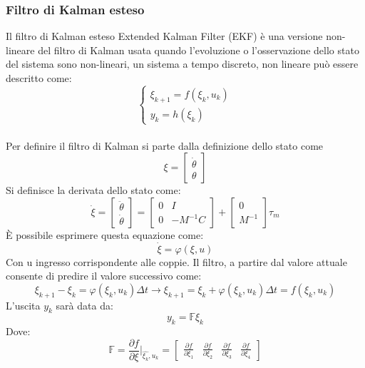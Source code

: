 \subsubsection*{Filtro di Kalman esteso}
Il filtro di Kalman esteso Extended Kalman Filter (EKF) è una versione non-lineare del filtro di Kalman usata quando l'evoluzione o l'osservazione dello stato del sistema sono non-lineari, un sistema a tempo discreto, non lineare può essere descritto come:
\begin{equation}
	\begin{cases}
		\xi_{k+1} = f(\xi_k,u_k)\\
		y_k = h(\xi_k)
	\end{cases}
\end{equation}
\\Per definire il filtro di Kalman si parte dalla definizione dello stato come
\begin{equation}
\xi = \begin{bmatrix}
\dot{\theta} \\ \theta
\end{bmatrix}
\end{equation}
Si definisce la derivata dello stato come:
\begin{equation}
\dot{\xi} = \begin{bmatrix}
\ddot{\theta} \\ \dot{\theta}
\end{bmatrix} =\begin{bmatrix}
0 & I \\ 0 & -M^{-1}C
\end{bmatrix} + \begin{bmatrix}
0 \\ M^{-1}
\end{bmatrix}\tau_m
\end{equation}
È possibile esprimere questa equazione come:
\begin{equation*}
\dot{\xi} = \varphi(\xi,u)
\end{equation*}
Con u ingresso corrispondente alle coppie. Il filtro, a partire dal valore attuale consente di predire il valore successivo come:
\begin{equation}
\xi_{k+1} - \xi_{k} = \varphi(\xi_k,u_k)\Delta t \rightarrow \xi_{k+1} = \xi_k + \varphi(\xi_k,u_k)\Delta t = f(\xi_k,u_k)
\end{equation}
L'uscita $y_k$ sarà data da: 
\begin{equation}
y_k = \mathbb{F}\xi_k
\end{equation}
Dove:
\begin{equation*}
\mathbb{F} = \frac{\partial f}{\partial \xi} \Bigg|_{\hat{\xi_k},u_k} = \begin{bmatrix}
\frac{\partial f}{\partial \xi_1} & \frac{\partial f}{\partial \xi_2} & \frac{\partial f}{\partial \xi_3} & \frac{\partial f}{\partial \xi_4}
\end{bmatrix}
\end{equation*}
